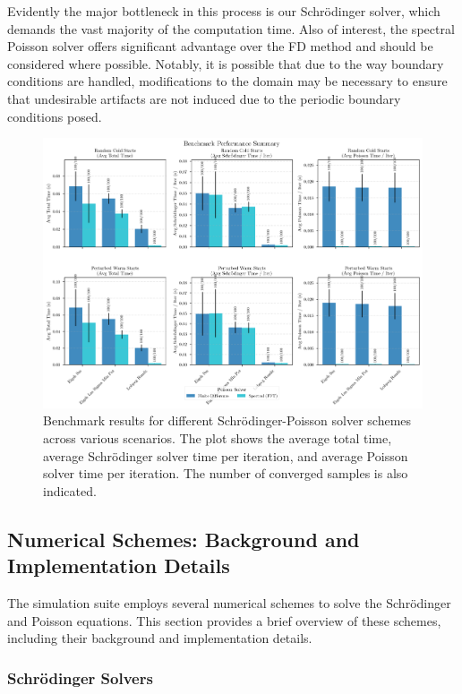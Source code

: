 \documentclass{article}
\begin{document}
Evidently the major bottleneck in this process is our Schrödinger solver, which demands the vast majority of the computation time. Also of interest, the spectral Poisson solver offers significant advantage over the FD method and should be considered where possible. Notably, it is possible that due to the way boundary conditions are handled, modifications to the domain may be necessary to ensure that undesirable artifacts are not induced due to the periodic boundary conditions posed.
\begin{figure}[h!]
	\centering
	\includegraphics[width=\textwidth]{../figures/my_benchmark_results.png}
	\caption{Benchmark results for different Schrödinger-Poisson solver schemes across various scenarios. The plot shows the average total time, average Schrödinger solver time per iteration, and average Poisson solver time per iteration. The number of converged samples is also indicated.}
	\label{fig:benchmark_summary}
\end{figure}

\subsection{Numerical Schemes: Background and Implementation Details}

The simulation suite employs several numerical schemes to solve the Schrödinger and Poisson equations. This section provides a brief overview of these schemes, including their background and implementation details.

\subsubsection{Schrödinger Solvers}
\end{document}
